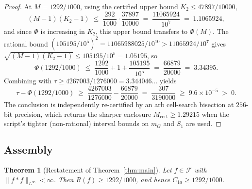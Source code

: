 \documentclass[11pt, letterpaper]{article}
\theoremstyle{plain}
\newtheorem{theorem}{Theorem}[section]
\theoremstyle{definition}
\newcommand{\Linf}{L^\infty}
\newcommand{\Mcert}{M_{\mathrm{cert}}}
\begin{document}
\begin{proof}
At $M=1292/1000$, using the certified upper bound $K_2\le 47897/10000$,
\[
  (M-1)(K_2-1) \;\le\; \frac{292}{1000}\cdot\frac{37897}{10000}
  \;=\; \frac{11065924}{10^{7}}
  \;=\; 1.1065924,
\]
and since $\Phi$ is increasing in $K_2$, this upper bound transfers
to $\Phi(M)$.  The rational bound
$(105195/10^{5})^{2}=11065988025/10^{10}>11065924/10^{7}$
gives $\sqrt{(M-1)(K_2-1)}\le 105195/10^{5}=1.05195$, so
\[
  \Phi(1292/1000)
  \;\le\; \frac{1292}{1000} + 1 + \frac{105195}{10^{5}}
  \;=\; \frac{66879}{20000}
  \;=\; 3.34395.
\]
Combining with $\tau\ge 4267003/1276000=3.344046\ldots$ yields
\[
  \tau-\Phi(1292/1000)
  \;\ge\; \frac{4267003}{1276000} - \frac{66879}{20000}
  \;=\; \frac{307}{3190000}
  \;\ge\; 9.6\times 10^{-5}\;>\;0.
\]
The conclusion is independently re-certified by an arb cell-search
bisection at $256$-bit precision, which returns the sharper enclosure
$\Mcert\ge 1.29215$ when the script's tighter (non-rational) interval
bounds on $m_G$ and $S_1$ are used.
\end{proof}

\subsection{Assembly}\label{subsec:proof-assembly}

\begin{theorem}[Restatement of Theorem~\ref{thm:main}]
\label{thm:main-restated}
Let $f\in\mathcal{F}$ with $\|f*f\|_{\Linf}<\infty$.  Then
$R(f)\ge 1292/1000$, and hence $C_{1a}\ge 1292/1000$.
\end{theorem}
\end{document}
